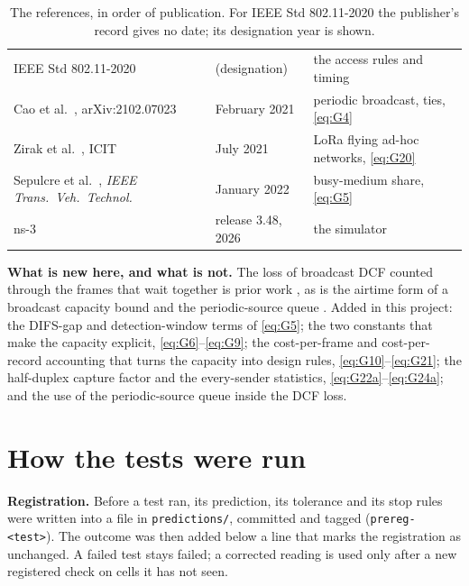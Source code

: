 \documentclass[11pt,a4paper]{article}
\begin{document}
\begin{table}[htbp]
\begin{tabularx}{\textwidth}{>{\raggedright\arraybackslash}p{4.6cm}>{\raggedright\arraybackslash}p{2.9cm}L}
IEEE Std 802.11-2020 \cite{ieee80211std2020} & 2020 (designation) & the access rules and timing \\
Cao et al.\ \cite{cao2021dsrc}, arXiv:2102.07023 & February 2021 & periodic broadcast, ties, \eqref{eq:G4} \\
Zirak et al.\ \cite{zirak2021swarm}, ICIT & July 2021 & LoRa flying ad-hoc networks, \eqref{eq:G20} \\
Sepulcre et al.\ \cite{sepulcre2022analytical}, \emph{IEEE Trans.\ Veh.\ Technol.} & January 2022 & busy-medium share, \eqref{eq:G5} \\
ns-3 \cite{nsnam} & release 3.48, 2026 & the simulator \\
\bottomrule
\end{tabularx}
\caption{The references, in order of publication. For IEEE Std 802.11-2020 the publisher's record
gives no date; its designation year is shown.}
\label{tab:refs}
\end{table}

\textbf{What is new here, and what is not.} The loss of broadcast DCF counted through the frames that
wait together is prior work \cite{machen2008,ma2009dsrc,cao2021dsrc}, as is the airtime form of a
broadcast capacity bound \cite{bazzi2016beaconing} and the periodic-source queue
\cite{roberts1991superposition}. Added in this project: the DIFS-gap and detection-window terms of
\eqref{eq:G5}; the two constants that make the capacity explicit, \eqref{eq:G6}--\eqref{eq:G9}; the
cost-per-frame and cost-per-record accounting that turns the capacity into design rules,
\eqref{eq:G10}--\eqref{eq:G21}; the half-duplex capture factor and the every-sender statistics,
\eqref{eq:G22a}--\eqref{eq:G24a}; and the use of the periodic-source queue inside the DCF loss.

\section{How the tests were run}\label{sec:method}

\textbf{Registration.} Before a test ran, its prediction, its tolerance and its stop rules were
written into a file in \texttt{predictions/}, committed and tagged (\texttt{prereg-<test>}). The
outcome was then added below a line that marks the registration as unchanged. A failed test stays
failed; a corrected reading is used only after a new registered check on cells it has not seen.
\end{document}
